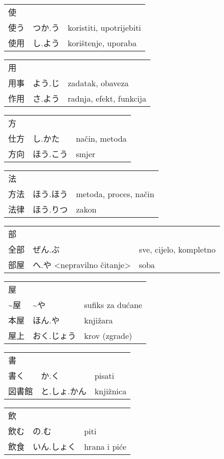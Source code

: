 

\newenvironment{dictentry}[1]{
	\begin{tabular}{p{2cm} p{3cm} p{10cm}}
		#1 &&\\
}{
	\end{tabular}
	\vspace{20pt}
}

\newcommand{\example}[3]{
	\hspace*{\fill}#1 & #2 & #3\\
}

\author{ロボット君}


\begin{dictentry}{使}
\example{使う}{つか.う}{koristiti, upotrijebiti}
\example{使用}{し.よう}{korištenje, uporaba}
\end{dictentry}

\begin{dictentry}{用}
\example{用事}{よう.じ}{zadatak, obaveza}
\example{作用}{さ.よう}{radnja, efekt, funkcija}
\end{dictentry}

\begin{dictentry}{方}
\example{仕方}{し.かた}{način, metoda}
\example{方向}{ほう.こう}{smjer}
\end{dictentry}

\begin{dictentry}{法}
\example{方法}{ほう.ほう}{metoda, proces, način}
\example{法律}{ほう.りつ}{zakon}
\end{dictentry}

\begin{dictentry}{部}
\example{全部}{ぜん.ぶ}{sve, cijelo, kompletno}
\example{部屋}{へ.や <nepravilno čitanje>}{soba}
\end{dictentry}

\begin{dictentry}{屋}
\example{\textasciitilde 屋}{\textasciitilde や}{sufiks za dućane}
\example{本屋}{ほん.や}{knjižara}
\example{屋上}{おく.じょう}{krov (zgrade)}
\end{dictentry}

\begin{dictentry}{書}
\example{書く}{か.く}{pisati}
\example{図書館}{と.しょ.かん}{knjižnica}
\end{dictentry}

\begin{dictentry}{飲}
\example{飲む}{の.む}{piti}
\example{飲食}{いん.しょく}{hrana i piće}
\end{dictentry}

